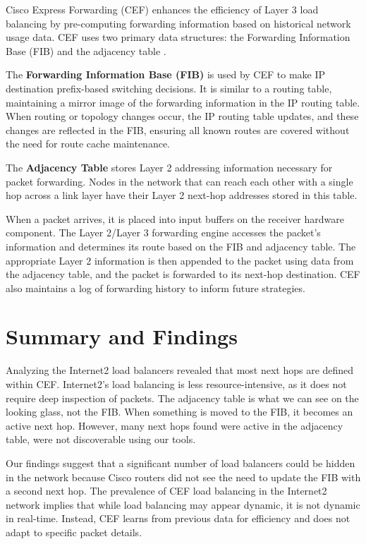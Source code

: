 \documentclass[12pt]{cwru_thesis}
\begin{document}
Cisco Express Forwarding (CEF) enhances the efficiency of Layer 3 load balancing by pre-computing forwarding information based on historical network usage data. CEF uses two primary data structures: the Forwarding Information Base (FIB) and the adjacency table \cite{cisco2017cef}.

The \textbf{Forwarding Information Base (FIB)} is used by CEF to make IP destination prefix-based switching decisions. It is similar to a routing table, maintaining a mirror image of the forwarding information in the IP routing table. When routing or topology changes occur, the IP routing table updates, and these changes are reflected in the FIB, ensuring all known routes are covered without the need for route cache maintenance.

The \textbf{Adjacency Table} stores Layer 2 addressing information necessary for packet forwarding. Nodes in the network that can reach each other with a single hop across a link layer have their Layer 2 next-hop addresses stored in this table. 

When a packet arrives, it is placed into input buffers on the receiver hardware component. The Layer 2/Layer 3 forwarding engine accesses the packet's information and determines its route based on the FIB and adjacency table. The appropriate Layer 2 information is then appended to the packet using data from the adjacency table, and the packet is forwarded to its next-hop destination. CEF also maintains a log of forwarding history to inform future strategies.

\section{Summary and Findings}

Analyzing the Internet2 load balancers revealed that most next hops are defined within CEF. Internet2's load balancing is less resource-intensive, as it does not require deep inspection of packets. The adjacency table is what we can see on the looking glass, not the FIB. When something is moved to the FIB, it becomes an active next hop. However, many next hops found were active in the adjacency table, were not discoverable using our tools.

Our findings suggest that a significant number of load balancers could be hidden in the network because Cisco routers did not see the need to update the FIB with a second next hop. The prevalence of CEF load balancing in the Internet2 network implies that while load balancing may appear dynamic, it is not dynamic in real-time. Instead, CEF learns from previous data for efficiency and does not adapt to specific packet details.
\end{document}

